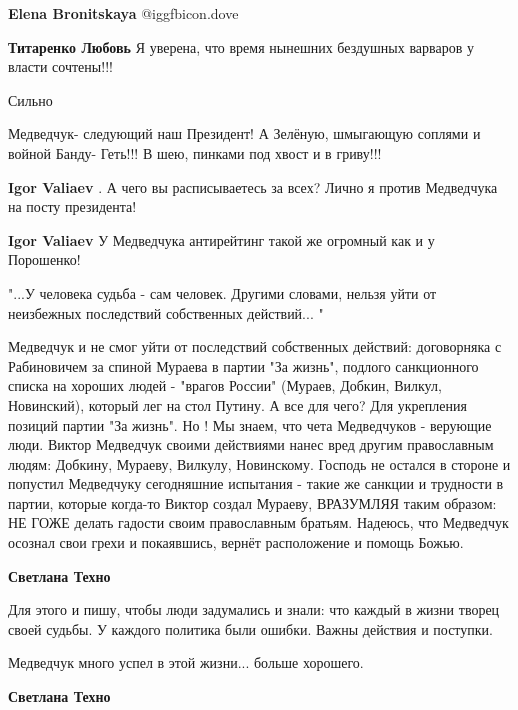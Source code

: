 \begin{itemize}
\begin{itemize} %
\textbf{Elena Bronitskaya}  @igg{fbicon.dove} 

\textbf{Титаренко Любовь} Я уверена, что время нынешних бездушных варваров у власти сочтены!!!
\end{itemize} %

Сильно

Медведчук- следующий наш Президент! А Зелёную, шмыгающую соплями и войной Банду- Геть!!! В шею, пинками под хвост и в гриву!!!

\begin{itemize} %
\textbf{Igor Valiaev} .
А чего вы расписываетесь за всех? Лично я против Медведчука на посту президента!

\textbf{Igor Valiaev} У Медведчука антирейтинг такой же огромный как и у Порошенко!
\end{itemize} %


"...У человека судьба - сам человек. Другими словами, нельзя уйти от неизбежных
последствий собственных действий... "

Медведчук и не смог уйти от последствий собственных действий: договорняка с
Рабиновичем за спиной Мураева в партии "За жизнь", подлого санкционного списка
на хороших людей - "врагов России" (Мураев, Добкин, Вилкул, Новинский), который
лег на стол Путину. А все для чего? Для укрепления позиций партии "За жизнь".
Но ! Мы знаем, что чета Медведчуков - верующие люди. Виктор Медведчук своими
действиями нанес вред другим православным людям: Добкину, Мураеву, Вилкулу,
Новинскому. Господь не остался в стороне и попустил Медведчуку сегодняшние
испытания - такие же санкции и трудности в партии, которые когда-то Виктор
создал Мураеву, ВРАЗУМЛЯЯ таким образом: НЕ ГОЖЕ делать гадости своим
православным братьям. Надеюсь, что Медведчук осознал свои грехи и покаявшись,
вернёт расположение и помощь Божью.

\begin{itemize} %
\textbf{Светлана Техно} 

Для этого и пишу, чтобы люди задумались и знали: что каждый в жизни творец
своей судьбы. У каждого политика были ошибки. Важны действия и поступки.

Медведчук много успел в этой жизни... больше хорошего.

\textbf{Светлана Техно} 


\end{itemize}
\end{itemize}
